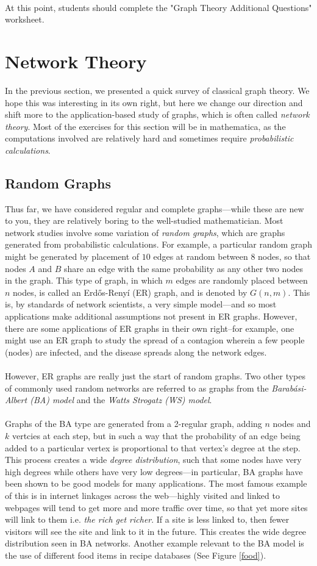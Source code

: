 \documentclass[12pt]{article}
\newcounter{exercise}[section]
\begin{document}
\\At this point, students should complete the "Graph Theory Additional Questions" worksheet.
\section{Network Theory}
In the previous section, we presented a quick survey of classical graph theory. We hope this was interesting in its own right, but here we change our direction and shift more to the application-based study of graphs, which is often called \emph{network theory}. Most of the exercises for this section will be in mathematica, as the computations involved are relatively hard and sometimes require \emph{probabilistic calculations}.
\subsection{Random Graphs}
Thus far, we have considered regular and complete graphs---while these are new to you, they are relatively boring to the well-studied mathematician. Most network studies involve some variation of \emph{random graphs}, which are graphs generated from probabilistic calculations. For example, a particular random graph might be generated by placement of $10$ edges at random between $8$ nodes, so that nodes $A$ and $B$ share an edge with the same probability as any other two nodes in the graph. This type of graph, in which $m$ edges are randomly placed between $n$ nodes, is called an Erdős-Renyí (ER) graph, and is denoted by $G(n,m)$. This is, by standards of network scientists, a very simple model---and so most applications make additional assumptions not present in ER graphs. However, there are some applications of ER graphs in their own right--for example, one might use an ER graph to study the spread of a contagion wherein a few people (nodes) are infected, and the disease spreads along the network edges.
\\
\\
However, ER graphs are really just the start of random graphs. Two other types of commonly used random networks are referred to as graphs from the \emph{Barabási-Albert (BA) model} and the \emph{Watts Strogatz (WS) model}. \\
\\Graphs of the BA type are generated from a 2-regular graph, adding $n$ nodes and $k$ vertcies at each step, but in such a way that the probability of an edge being added to a particular vertex is proportional to that vertex's degree at the step. This process creates a wide \emph{degree distribution}, such that some nodes have very high degrees while others have very low degrees---in particular, BA graphs have been shown to be good models for many applications. The most famous example of this is in internet linkages across the web---highly visited and linked to webpages will tend to get more and more traffic over time, so that yet more sites will link to them i.e. \emph{the rich get richer}. If a site is less linked to, then fewer visitors will see the site and link to it in the future. This creates the wide degree distribution seen in BA networks. Another example relevant to the BA model is the use of different food items in recipe databases (See Figure \ref{food}).\\
\end{document}
